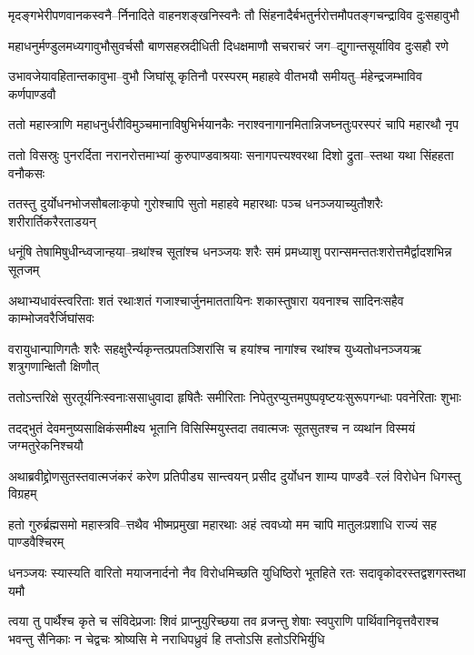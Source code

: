 \twolineshloka
{मृदङ्गभेरीपणवानकस्वनै--र्निनादिते वाहनशङ्खनिस्वनैः}
{तौ सिंहनादैर्बभतुर्नरोत्तमौपतङ्गचन्द्राविव दुःसहावुभौ}


\twolineshloka
{महाधनुर्मण्डुलमध्यगावुभौसुवर्चसौ बाणसहस्रदीधिती}
{दिधक्षमाणौ सचराचरं जग--द्युगान्तसूर्याविव दुःसहौ रणे}


\twolineshloka
{उभावजेयावहितान्तकावुभा--वुभौ जिघांसू कृतिनौ परस्परम्}
{महाहवे वीतभयौ समीयतु--र्महेन्द्रजम्भाविव कर्णपाण्डवौ}


\twolineshloka
{ततो महास्त्राणि महाधनुर्धरौविमुञ्चमानाविषुभिर्भयानकैः}
{नराश्वनागानमितान्निजघ्नतुःपरस्परं चापि महारथौ नृप}


\twolineshloka
{ततो विसस्रुः पुनरर्दिता नरानरोत्तमाभ्यां कुरुपाण्डवाश्रयाः}
{सनागपत्त्यश्वरथा दिशो द्रुता--स्तथा यथा सिंहहता वनौकसः}


\twolineshloka
{ततस्तु दुर्योधनभोजसौबलाःकृपो गुरोश्चापि सुतो महाहवे}
{महारथाः पञ्च धनञ्जयाच्युतौशरैः शरीरार्तिकरैरताडयन्}


\twolineshloka
{धनूंषि तेषामिषुधीन्ध्वजान्हया--न्रथांश्च सूतांश्च धनञ्जयः शरैः}
{समं प्रमध्याशु परान्समन्ततःशरोत्तमैर्द्वादशभिन्न सूतजम्}


\twolineshloka
{अथाभ्यधावंस्त्वरिताः शतं रथाःशतं गजाश्चार्जुनमाततायिनः}
{शकास्तुषारा यवनाश्च सादिनःसहैव काम्भोजवरैर्जिघांसवः}


\twolineshloka
{वरायुधान्पाणिगतैः शरैः सहक्षुरैर्न्यकृन्तत्प्रपतञ्शिरांसि च}
{हयांश्च नागांश्च रथांश्च युध्यतोधनञ्जयऋ शत्रुगणान्क्षितौ क्षिणौत्}


\twolineshloka
{ततोऽन्तरिक्षे सुरतूर्यनिःस्वनाःससाधुवादा हृषितैः समीरिताः}
{निपेतुरप्युत्तमपुष्पवृष्टयःसुरूपगन्धाः पवनेरिताः शुभाः}


\twolineshloka
{तदद्भुतं देवमनुष्यसाक्षिकंसमीक्ष्य भूतानि विसिस्मियुस्तदा}
{तवात्मजः सूतसुतश्च न व्यथांन विस्मयं जग्मतुरेकनिश्चयौ}


\twolineshloka
{अथाब्रवीद्द्रोणसुतस्तवात्मजंकरं करेण प्रतिपीड्य सान्त्वयन्}
{प्रसीद दुर्योधन शाम्य पाण्डवै--रलं विरोधेन धिगस्तु विग्रहम्}


\twolineshloka
{हतो गुरुर्ब्रह्मसमो महास्त्रवि--त्तथैव भीष्मप्रमुखा महारथाः}
{अहं त्ववध्यो मम चापि मातुलःप्रशाधि राज्यं सह पाण्डवैश्चिरम्}


\twolineshloka
{धनञ्जयः स्यास्यति वारितो मयाजनार्दनो नैव विरोधमिच्छति}
{युधिष्ठिरो भूतहिते रतः सदावृकोदरस्तद्वशगस्तथा यमौ}


\threelineshloka
{त्वया तु पार्थैश्च कृते च संविदेप्रजाः शिवं प्राप्नुयुरिच्छया तव}
{व्रजन्तु शेषाः स्वपुराणि पार्थिवानिवृत्तवैराश्च भवन्तु सैनिकाः}
{न चेद्वचः श्रोष्यसि मे नराधिपध्रुवं हि तप्तोऽसि हतोऽरिभिर्युधि}


